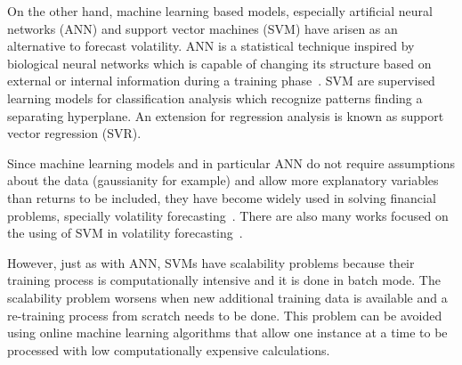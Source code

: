 On the other hand, machine learning based models, especially artificial neural
networks (ANN) and support vector machines (SVM) have arisen as an alternative
to forecast volatility. ANN is a statistical technique inspired by biological
neural networks which is capable of changing its structure based on external or
internal information during a training phase~\cite{sammut2011}. SVM are
supervised learning models for classification analysis which recognize patterns
finding a separating hyperplane. An extension for regression analysis is known
as support vector regression (SVR). 

Since machine learning models and in particular ANN do not require assumptions
about the data (gaussianity for example) and allow more explanatory variables
than returns to be included, they have become widely used in solving financial
problems, specially volatility
forecasting~\cite{hamidetal2004,donaldsonetal1997}. There are also many works
focused on the using of SVM in volatility
forecasting~\cite{shiyietal2008,shiyietal2010,gavrishchaka2006,vasilios2012}. 

However, just as with ANN, SVMs have scalability problems because their training
process is computationally intensive and it is done in batch mode. The
scalability problem worsens when new additional training data is available and a
re-training process from scratch needs to be done. This problem can be avoided
using online machine learning algorithms that allow one instance at a time to be
processed with low computationally expensive calculations.


